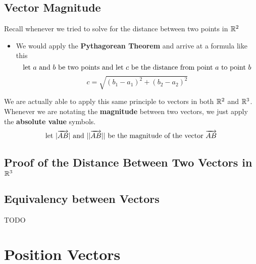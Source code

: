 \documentclass{report}
\begin{document}
\begin{sloppypar}
\subsection{Vector Magnitude}
Recall whenever we tried to solve for the
distance between two points in $ \mathbb{R}^{2} $
\begin{itemize}
  \item We would apply the \textbf{Pythagorean Theorem}
        and arrive at a formula like this
        \[ \textrm{let $ a$ and $ b $ be two points
        and let $ c $ be the distance from point $ a $
        to point $ b $}\]
        \[ c = \sqrt{(b_{1} - a_{1})^{2} + (b_{2} - a_{2})^{2}} \]
\end{itemize}
We are actually able to apply this same principle to
vectors in both $ \mathbb{R}^{2} $ and $ \mathbb{R}^{3} $. Whenever
we are notating the \textbf{magnitude} between two
vectors, we just apply the \textbf{absolute value} symbols.
\[ \textrm{let $|\overrightarrow{AB}|$ and
    $ ||\overrightarrow{AB}||$ be the
  magnitude of the vector $ \overrightarrow{AB} $}\]
\begin{center}
\end{center}

\begin{center}
\end{center}
\subsection{Proof of the Distance Between Two Vectors
in $ \mathbb{R}^{3} $}
\subsection{Equivalency between Vectors}
TODO
\section{Position Vectors}
\begin{center}
\end{center}

\end{sloppypar}
\end{document}

